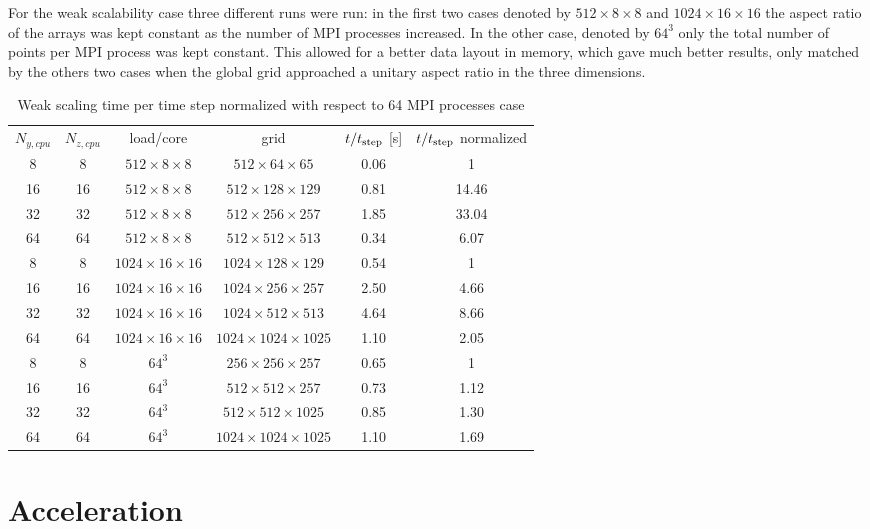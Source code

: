 For the weak scalability case three different runs were run: in the first two cases denoted by $512\times8\times8$ and $1024\times16\times16$ the aspect ratio of the arrays was kept constant as the number of MPI processes increased. In the other case, denoted by $64^3$ only the total number of points per MPI process was kept constant. This allowed for a better data layout in memory, which gave much better results, only matched by the others two cases when the global grid approached a unitary aspect ratio in the three dimensions.
\begin{table}[H]
\centering
\caption{Weak scaling time per time step normalized with respect to 64 MPI processes case}
\begin{tabular}{c|c|c|c|c|c}
$N_{y,cpu}$ & $N_{z,cpu}$& load/core & grid & $t/t_{\textnormal{step}}$ [s] &$t/t_{\textnormal{step}}$ normalized\\[1.5ex]
8& 8 & $512\times8\times8$  &$512\times64\times65$ &  0.06 & 1\\
16 &16&$512\times8\times8$  & $512\times128\times129$& 0.81 & 14.46\\
32 &32&$512\times8\times8$  & $512\times256\times257$& 1.85 & 33.04\\
64 &64 &$512\times8\times8$  &$512\times512\times513$ & 0.34 & 6.07 \\
\hline
8& 8&$1024\times16\times16$  & $1024\times128\times129$ &0.54 &1 \\
16& 16& $1024\times16\times16$  & $1024\times256\times257$ &2.50 & 4.66\\
32 &32 &$1024\times16\times16$  & $1024\times512\times513$ &4.64 & 8.66\\
64 &64 &$1024\times16\times16$  & $1024\times1024\times1025$ &1.10 & 2.05\\
\hline
8& 8 & $64^3$& $256\times256\times257$ & 0.65& 1\\
16& 16&$64^3$&$512\times512\times257$ & 0.73 &1.12 \\
32& 32 &$64^3$&$512\times512\times1025$ &0.85 & 1.30 \\
64& 64 &$64^3$&$1024\times1024\times1025$ &1.10 &1.69 \\ 
\end{tabular}
\end{table}



\section{Acceleration}
\label{sec: acceleration}

